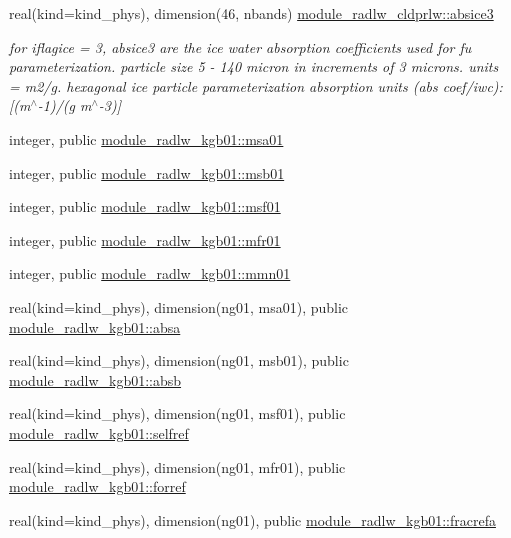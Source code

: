 \begin{DoxyCompactItemize}
real(kind=kind\+\_\+phys), dimension(46, nbands) \hyperlink{namespacemodule__radlw__cldprlw_a3aa04541d0b809367f88ef8aa0eafdbb}{module\+\_\+radlw\+\_\+cldprlw\+::absice3}
\begin{DoxyCompactList}\small\item\em for iflagice = 3, absice3 are the ice water absorption coefficients used for fu parameterization. particle size 5 -\/ 140 micron in increments of 3 microns. units = m2/g. hexagonal ice particle parameterization absorption units (abs coef/iwc)\+: \mbox{[}(m$^\wedge$-\/1)/(g m$^\wedge$-\/3)\mbox{]} \end{DoxyCompactList}\item 
integer, public \hyperlink{namespacemodule__radlw__kgb01_a60db2a67b7f03a52fa88acd2c7874dfc}{module\+\_\+radlw\+\_\+kgb01\+::msa01}
\item 
integer, public \hyperlink{namespacemodule__radlw__kgb01_ae34d953adc793ad27a294864e3e0e354}{module\+\_\+radlw\+\_\+kgb01\+::msb01}
\item 
integer, public \hyperlink{namespacemodule__radlw__kgb01_a321c2e84e14d28142d08bb5fbe485a67}{module\+\_\+radlw\+\_\+kgb01\+::msf01}
\item 
integer, public \hyperlink{namespacemodule__radlw__kgb01_a4bd2e710d96291436f9ee36e99816a19}{module\+\_\+radlw\+\_\+kgb01\+::mfr01}
\item 
integer, public \hyperlink{namespacemodule__radlw__kgb01_a218c6844f9043f362571f091a4f80522}{module\+\_\+radlw\+\_\+kgb01\+::mmn01}
\item 
real(kind=kind\+\_\+phys), dimension(ng01, msa01), public \hyperlink{namespacemodule__radlw__kgb01_acdbe767d50d503c4a89d4042dd0dee8e}{module\+\_\+radlw\+\_\+kgb01\+::absa}
\item 
real(kind=kind\+\_\+phys), dimension(ng01, msb01), public \hyperlink{namespacemodule__radlw__kgb01_abdaefe1c38d8bfcac5ef9b878fac77cb}{module\+\_\+radlw\+\_\+kgb01\+::absb}
\item 
real(kind=kind\+\_\+phys), dimension(ng01, msf01), public \hyperlink{namespacemodule__radlw__kgb01_a14c7cc68b26c0ab1fdfda6faa2d485d5}{module\+\_\+radlw\+\_\+kgb01\+::selfref}
\item 
real(kind=kind\+\_\+phys), dimension(ng01, mfr01), public \hyperlink{namespacemodule__radlw__kgb01_acd70a32f88808dc40c39edee5b76adbe}{module\+\_\+radlw\+\_\+kgb01\+::forref}
\item 
real(kind=kind\+\_\+phys), dimension(ng01), public \hyperlink{namespacemodule__radlw__kgb01_a0bca660247ac37483cd55c6936056631}{module\+\_\+radlw\+\_\+kgb01\+::fracrefa}

\end{DoxyCompactItemize}

